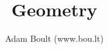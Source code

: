 \documentclass[oneside]{book}
\begin{document}
\author{Adam Boult (www.bou.lt)}
\title{Geometry}
\maketitle

\setcounter{tocdepth}{0}
\tableofcontents


\end{document}
